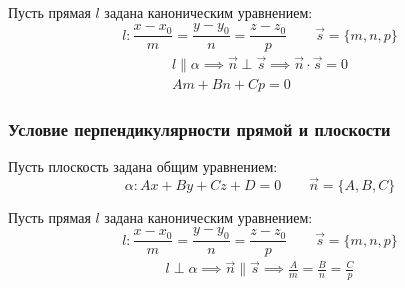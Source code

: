 Пусть прямая $l$ задана каноническим уравнением:  \[
  l: \frac{x - x_0}{m} = \frac{y - y_0}{n} = \frac{z - z_0}{p} \qquad \vec{s} = \{m, n, p\} 
\] 
\begin{gather*}
  l \parallel \alpha \implies \vec{n} \perp \vec{s} \implies \vec{n} \cdot \vec{s} = 0 \\
  \boxed{Am + Bn + Cp = 0}
\end{gather*}

\subsubsection{Условие перпендикулярности прямой и плоскости}

Пусть плоскость задана общим уравнением: \[
  \alpha: Ax + By + Cz + D = 0 \qquad \vec{n} = \{A, B, C\} 
\] 

Пусть прямая $l$ задана каноническим уравнением:  \[
  l: \frac{x - x_0}{m} = \frac{y - y_0}{n} = \frac{z - z_0}{p} \qquad \vec{s} = \{m, n, p\} 
\] 
\begin{gather*}
  l \perp \alpha \implies \vec{n} \parallel \vec{s} \implies
  \boxed{\frac{A}{m} = \frac{B}{n} = \frac{C}{p}}
\end{gather*}

